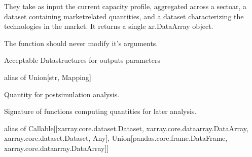 \documentclass[letterpaper,10pt,english]{sphinxmanual}
\begin{document}
They take as input the current capacity profile, aggregated across a sectoar,
a dataset containing market\sphinxhyphen{}related quantities, and a dataset characterizing the
technologies in the market. It returns a single xr.DataArray object.

The function should never modify it’s arguments.

\begin{fulllineitems}
\label{\detokenize{api:muse.outputs.sector.OUTPUTS_PARAMETERS}}
Acceptable Datastructures for outputs parameters

alias of Union{[}str, Mapping{]}

\end{fulllineitems}


\begin{fulllineitems}
\label{\detokenize{api:muse.outputs.sector.OUTPUT_QUANTITIES}}
Quantity for post\sphinxhyphen{}simulation analysis.

\end{fulllineitems}


\begin{fulllineitems}
\label{\detokenize{api:muse.outputs.sector.OUTPUT_QUANTITY_SIGNATURE}}
Signature of functions computing quantities for later analysis.

alias of Callable{[}{[}xarray.core.dataset.Dataset, xarray.core.dataarray.DataArray, xarray.core.dataset.Dataset, Any{]}, Union{[}pandas.core.frame.DataFrame, xarray.core.dataarray.DataArray{]}{]}

\end{fulllineitems}

\end{document}
